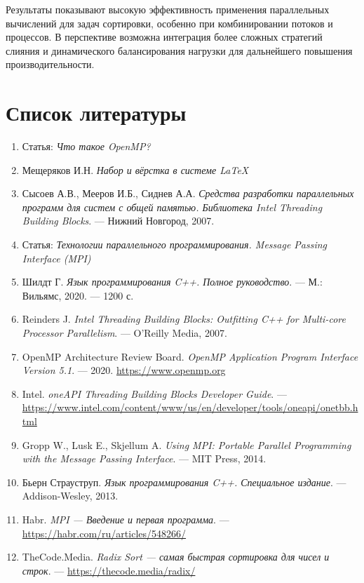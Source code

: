 \documentclass[12pt]{article}
\begin{document}
\hspace*{1.25em}Результаты показывают высокую эффективность применения параллельных вычислений для задач сортировки, особенно при комбинировании потоков и процессов. В перспективе возможна интеграция более сложных стратегий слияния и динамического балансирования нагрузки для дальнейшего повышения производительности.

\section{Список литературы}
\begin{enumerate}
    \item Статья: \textit{Что такое OpenMP?}
    \item Мещеряков И.Н. \textit{Набор и вёрстка в системе \LaTeX}
    \item Сысоев А.В., Мееров И.Б., Сиднев А.А. \textit{Средства разработки параллельных программ для систем с общей памятью. Библиотека Intel Threading Building Blocks}. — Нижний Новгород, 2007.
    \item Статья: \textit{Технологии параллельного программирования. Message Passing Interface (MPI)}
    \item Шилдт Г. \textit{Язык программирования C++. Полное руководство}. — М.: Вильямс, 2020. — 1200 с.
    \item Reinders J. \textit{Intel Threading Building Blocks: Outfitting C++ for Multi-core Processor Parallelism}. — O’Reilly Media, 2007.
    \item OpenMP Architecture Review Board. \textit{OpenMP Application Program Interface Version 5.1}. — 2020. \url{https://www.openmp.org}
    \item Intel. \textit{oneAPI Threading Building Blocks Developer Guide}. — \url{https://www.intel.com/content/www/us/en/developer/tools/oneapi/onetbb.html}
    \item Gropp W., Lusk E., Skjellum A. \textit{Using MPI: Portable Parallel Programming with the Message Passing Interface}. — MIT Press, 2014.
    \item Бьерн Страуструп. \textit{Язык программирования C++. Специальное издание}. — Addison-Wesley, 2013.
    \item Habr. \textit{MPI — Введение и первая программа}. — \url{https://habr.com/ru/articles/548266/}
    \item TheCode.Media. \textit{Radix Sort — самая быстрая сортировка для чисел и строк}. — \url{https://thecode.media/radix/}
\end{enumerate}
\appendix
\end{document}
